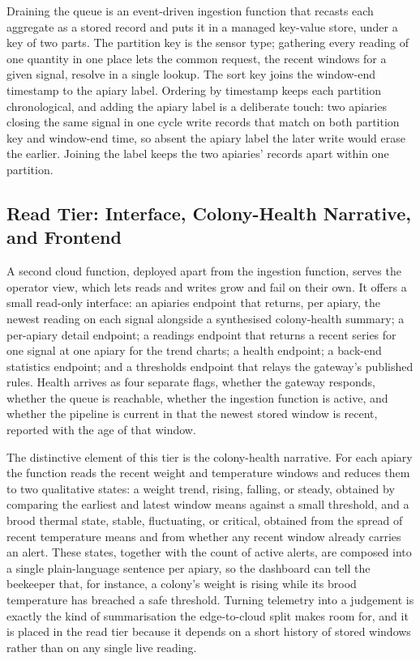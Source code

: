 \documentclass[conference]{IEEEtran}
\begin{document}
Draining the queue is an event-driven ingestion function that recasts each aggregate as a stored record and puts it in a managed key-value store, under a key of two parts. The partition key is the sensor type; gathering every reading of one quantity in one place lets the common request, the recent windows for a given signal, resolve in a single lookup. The sort key joins the window-end timestamp to the apiary label. Ordering by timestamp keeps each partition chronological, and adding the apiary label is a deliberate touch: two apiaries closing the same signal in one cycle write records that match on both partition key and window-end time, so absent the apiary label the later write would erase the earlier. Joining the label keeps the two apiaries' records apart within one partition.

\subsection{Read Tier: Interface, Colony-Health Narrative, and Frontend}

A second cloud function, deployed apart from the ingestion function, serves the operator view, which lets reads and writes grow and fail on their own. It offers a small read-only interface: an apiaries endpoint that returns, per apiary, the newest reading on each signal alongside a synthesised colony-health summary; a per-apiary detail endpoint; a readings endpoint that returns a recent series for one signal at one apiary for the trend charts; a health endpoint; a back-end statistics endpoint; and a thresholds endpoint that relays the gateway's published rules. Health arrives as four separate flags, whether the gateway responds, whether the queue is reachable, whether the ingestion function is active, and whether the pipeline is current in that the newest stored window is recent, reported with the age of that window.

The distinctive element of this tier is the colony-health narrative. For each apiary the function reads the recent weight and temperature windows and reduces them to two qualitative states: a weight trend, rising, falling, or steady, obtained by comparing the earliest and latest window means against a small threshold, and a brood thermal state, stable, fluctuating, or critical, obtained from the spread of recent temperature means and from whether any recent window already carries an alert. These states, together with the count of active alerts, are composed into a single plain-language sentence per apiary, so the dashboard can tell the beekeeper that, for instance, a colony's weight is rising while its brood temperature has breached a safe threshold. Turning telemetry into a judgement is exactly the kind of summarisation the edge-to-cloud split makes room for, and it is placed in the read tier because it depends on a short history of stored windows rather than on any single live reading.
\end{document}

